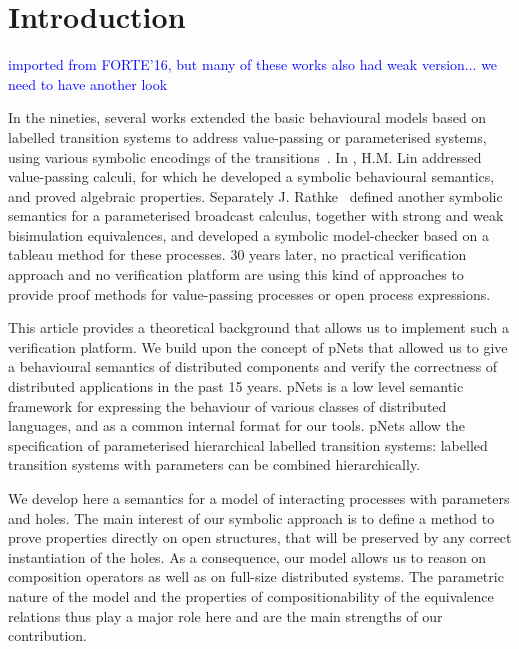 \documentclass{lncs/llncs}
\newcommand{\ERIC}[1]{\textcolor{blue}{#1}}
\begin{document}
\section{Introduction}

\ERIC{imported from FORTE'16, but many of these works also had weak
  version... we need to have another look}

In the nineties, several 
works extended the basic behavioural models based on labelled
transition systems to address value-passing or parameterised systems, using
various symbolic encodings of the
transitions~\cite{deSimone85,Larsen87,HennessyLin:TCS95,Linconcur96}. 
In \cite{Linconcur96}, H.M. Lin addressed value-passing calculi, for which he
developed a symbolic behavioural semantics, and proved algebraic properties.
Separately J. Rathke~\cite{HennessyRathke:TCS98} defined another
symbolic semantics for 
a parameterised broadcast calculus, together with strong and weak bisimulation
equivalences, and developed a symbolic model-checker based on a tableau
method for these processes. 30 years later, no
practical verification approach and no verification platform are
using this kind of approaches to provide proof methods for
value-passing processes or open process expressions. 


This article provides a theoretical background that allows us to implement such a verification platform. We build upon the concept of pNets that allowed us to give a behavioural semantics of distributed components and verify the correctness of distributed applications in the past 15 years. pNets  is a
low level semantic framework for expressing the behaviour of various
classes of distributed languages, and as a common internal format for
our tools.  pNets allow the
specification of parameterised hierarchical labelled
transition systems:  labelled transition systems with parameters can be
combined hierarchically.


We develop here a semantics for a model of interacting processes with parameters and holes. 
The main interest of our symbolic approach is to define a method to
prove properties directly on open structures, that will be preserved
by any correct instantiation of the holes.
As a consequence, our model allows us to reason on composition operators as well as on full-size distributed systems. The parametric nature of the model and the properties of compositionability of the equivalence relations thus play a major role here and are the main strengths of  our contribution.
\end{document}
